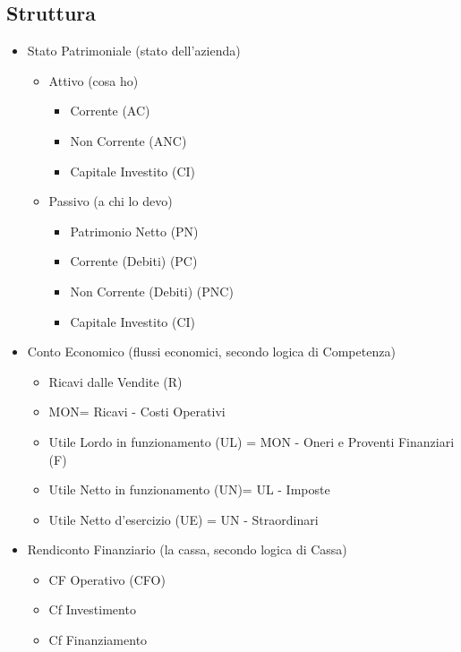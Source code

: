 \documentclass[a4paper]{report}
\begin{document}
\subsection*{Struttura}
\begin{itemize}
    \item Stato Patrimoniale (stato dell'azienda) \begin{itemize}
        \item Attivo (cosa ho) \begin{itemize}
            \item Corrente (AC)
            \item Non Corrente (ANC)
            \item Capitale Investito (CI)
        \end{itemize}
        \item Passivo (a chi lo devo) \begin{itemize}
            \item Patrimonio Netto (PN)
            \item Corrente (Debiti) (PC)
            \item Non Corrente (Debiti) (PNC)
            \item Capitale Investito (CI)
        \end{itemize}
    \end{itemize}
    \item Conto Economico (flussi economici, secondo logica di Competenza)\begin{itemize}
        \item Ricavi dalle Vendite (R)
        \item MON= Ricavi - Costi Operativi
        \item Utile Lordo in funzionamento (UL) = MON - Oneri e Proventi Finanziari (F)
        \item Utile Netto in funzionamento (UN)= UL - Imposte
        \item Utile Netto d'esercizio (UE) = UN - Straordinari
    \end{itemize}
    \item Rendiconto Finanziario (la cassa, secondo logica di Cassa) \begin{itemize}
        \item CF Operativo (CFO)
        \item Cf Investimento
        \item Cf Finanziamento
    \end{itemize}
\end{itemize}
\end{document}
